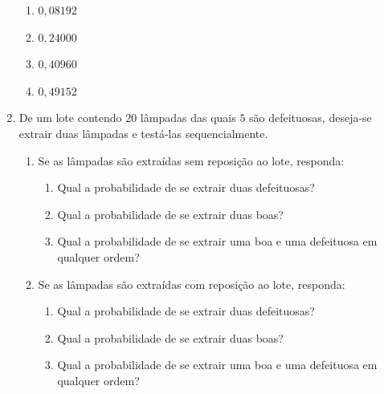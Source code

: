 \begin{enumerate}
\begin{enumerate}
\item {} 
$0{,}08192$

\item {} 
$0{,}24000$

\item {} 
$0{,}40960$

\item {} 
$0{,}49152$

\end{enumerate}

\item De um lote contendo $20$ lâmpadas das quais $5$ são defeituosas, deseja-se extrair duas lâmpadas e testá-las sequencialmente.
\begin{enumerate}
\item {} 
Se as lâmpadas são extraídas sem reposição ao lote, responda:
\begin{enumerate}[label=\roman*)]
\item {} 
Qual a probabilidade de se extrair duas defeituosas?

\item {} 
Qual a probabilidade de se extrair duas boas?

\item {} 
Qual a probabilidade de se extrair uma boa e uma defeituosa em qualquer ordem?

\end{enumerate}

\item {} 
Se as lâmpadas são extraídas com reposição ao lote, responda:

\begin{enumerate}[label=\roman*)]
\item {} 
Qual a probabilidade de se extrair duas defeituosas?

\item {} 
Qual a probabilidade de se extrair duas boas?

\item {} 
Qual a probabilidade de se extrair uma boa e uma defeituosa em qualquer ordem?

\end{enumerate}
\end{enumerate}
\end{enumerate}




